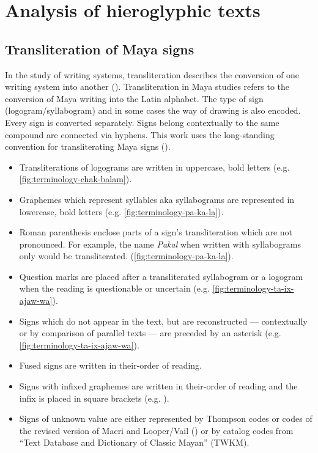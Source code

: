 \documentclass[../main.tex]{subfiles}
\begin{document}
\section{Analysis of hieroglyphic texts}

\subsection{Transliteration of Maya signs}
In the study of writing systems, transliteration describes the conversion of one 
writing system into another (\cite[494]{crystal2008}).
Transliteration in Maya studies refers to the conversion of Maya writing into the Latin alphabet.
The type of sign (logogram/syllabogram) and in some cases the way of drawing is also encoded.
Every sign is converted separately.
Signs belong contextually to the same compound are connected via hyphens. 
This work uses the long-standing convention for transliterating 
Maya signs (\cite{jamesjusteson1984}).
\begin{itemize}
    \item Transliterations of logograms are written in uppercase, bold letters 
          (e.g. \cref{fig:terminology-chak-balam}).
    \item Graphemes which represent syllables aka syllabograms are represented in 
          lowercase, bold letters (e.g. \cref{fig:terminology-pa-ka-la}).
    \item Roman parenthesis enclose parts of a sign's transliteration which are not pronounced.
          For example, the name \emph{Pakal} when written with syllabograms only would be 
          transliterated.
          (\cref{fig:terminology-pa-ka-la}).
    \item Question marks are placed after a transliterated syllabogram or a 
          logogram when the reading is questionable or uncertain 
          (e.g. \cref{fig:terminology-ta-ix-ajaw-wa}).
    \item Signs which do not appear in the text, but are reconstructed 
          --- contextually or by comparison of parallel texts --- are preceded by an asterisk
          (e.g. \cref{fig:terminology-ta-ix-ajaw-wa}).
    \item Fused signs are written in their-order of reading.
    \item Signs with infixed graphemes are written in their-order of reading and the infix is placed
          in square brackets 
          (e.g. ).
    \item Signs of unknown value are either represented by Thompson codes or codes of the 
          revised version of Macri and Looper/Vail (\cites{macrilooper2003}{macrivail2009}) 
          or by catalog codes from ``Text Database and Dictionary of Classic Mayan'' (TWKM).
\end{itemize}
\end{document}

